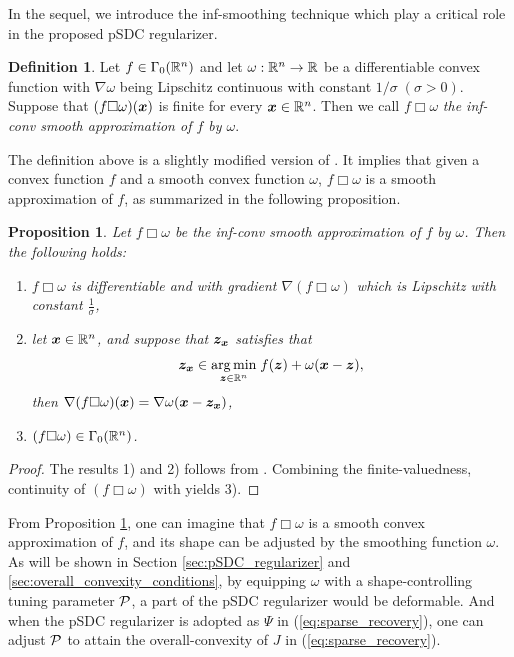 \documentclass[lettersize,journal]{IEEEtran}
\theoremstyle{plain}%
\newtheorem{proposition}{Proposition}
\theoremstyle{definition}
\newtheorem{definition}{Definition}
\theoremstyle{remark}
\begin{document}
In the sequel, we introduce the inf-smoothing technique which play a critical role in the proposed pSDC regularizer.
\begin{definition}\label{def:inf_conv_approximation}
Let $f\in\Gamma_0(\mathbb{R}^n)$ and let $\omega:\mathbb{R}^n\to\mathbb{R}$ be a differentiable convex function with $\nabla\omega$ being Lipschitz continuous with constant $1/\sigma\; (\sigma>0)$. Suppose that $(f\Box \omega)(\bm{x})$ is finite for every $\bm{x}\in\mathbb{R}^n$. Then we call $f\Box \omega$ \textit{the inf-conv smooth approximation of $f$ by $\omega$}.
\end{definition}
The definition above is a slightly modified version of \cite[Def. 4.2]{beck2012}. It implies that given a convex function $f$ and a smooth convex function $\omega$, $f\Box\omega$ is a smooth approximation of $f$, as summarized in the following proposition.
\begin{proposition}\label{prop:inf_conv_smooth_approximation}
Let $f\Box\omega$ be the inf-conv smooth approximation of $f$ by $\omega$. Then the following holds:
\begin{enumerate}
\item $f\Box \omega$ is differentiable and with gradient $\nabla (f\Box\omega)$ which is Lipschitz with constant $\frac{1}{\sigma}$,

\item let $\bm{x}\in\mathbb{R}^n$, and suppose that $\bm{z}_{\bm{x}}$ satisfies that
\begin{equation*}
\bm{z}_{\bm{x}}\in\underset{{\bm{z}\in\mathbb{R}^n}}{\mathrm{arg\,min}}\; f(\bm{z})+\omega(\bm{x}-\bm{z}),
\end{equation*}
then $\nabla (f\Box\omega)(\bm{x})=\nabla\omega(\bm{x}-\bm{z}_{\bm{x}})$,

\item $(f\Box \omega)\in\Gamma_0(\mathbb{R}^n)$.
\end{enumerate}
\end{proposition}
\begin{proof}
The results 1) and 2) follows from \cite[Thm. 4.1]{beck2012}. Combining the finite-valuedness, continuity of $(f\Box \omega)$ with \cite[Prop. 12.11]{bauschke2017} yields 3).
\end{proof}

From Proposition \ref{prop:inf_conv_smooth_approximation}, one can imagine that $f\Box\omega$ is a smooth convex approximation of $f$, and its shape can be adjusted by the smoothing function $\omega$. As will be shown in Section \ref{sec:pSDC_regularizer} and \ref{sec:overall_convexity_conditions}, by equipping $\omega$ with a shape-controlling tuning parameter $\mathcal{P}$, a part of the pSDC regularizer would be deformable. And when the pSDC regularizer is adopted as $\Psi$ in (\ref{eq:sparse_recovery}), one can adjust $\mathcal{P}$ to attain the overall-convexity of $J$ in (\ref{eq:sparse_recovery}).
\end{document}
